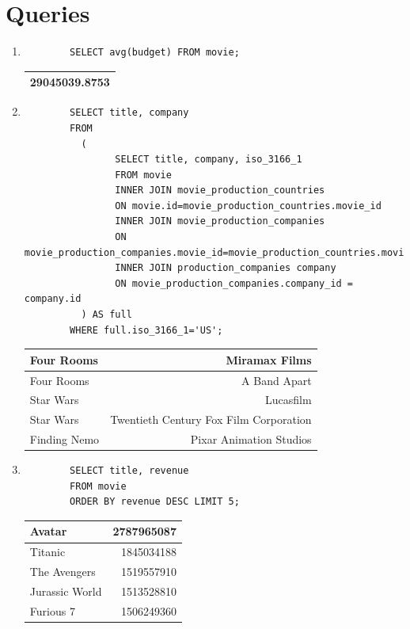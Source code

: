 \documentclass[11pt]{article}
\begin{document}
\pagebreak
\section{Queries}
\begin{enumerate}
	\item
		\begin{lstlisting}
		SELECT avg(budget) FROM movie;
		\end{lstlisting}
  		\begin{tabular}{| c | }
    			\hline
    				29045039.8753 \\
    			\hline
  		\end{tabular}

	\item
		\begin{lstlisting}
		SELECT title, company
		FROM
	  	  (
	    	    SELECT title, company, iso_3166_1
	    	    FROM movie
	    	    INNER JOIN movie_production_countries
	    	    ON movie.id=movie_production_countries.movie_id
	    	    INNER JOIN movie_production_companies
	    	    ON movie_production_companies.movie_id=movie_production_countries.movie_id
	    	    INNER JOIN production_companies company
	    	    ON movie_production_companies.company_id = company.id
	  	  ) AS full
		WHERE full.iso_3166_1='US';
		\end{lstlisting}
		\begin{tabular}[t]{| l | r | }
			\hline
			Four Rooms & Miramax Films \\ \hline
			Four Rooms & A Band Apart \\ \hline
			Star Wars & Lucasfilm \\ \hline
			Star Wars & Twentieth Century Fox Film Corporation \\ \hline
			Finding Nemo & Pixar Animation Studios \\
			\hline
		\end{tabular}
	\item
		\begin{lstlisting}
		SELECT title, revenue
		FROM movie
		ORDER BY revenue DESC LIMIT 5;
		\end{lstlisting}
		\begin{tabular}[t]{| l | r | }
			\hline
			Avatar & 2787965087 \\ \hline
			Titanic & 1845034188 \\ \hline
			The Avengers & 1519557910 \\ \hline
			Jurassic World & 1513528810 \\ \hline
			Furious 7 & 1506249360 \\

\end{tabular}
\end{enumerate}
\end{document}
